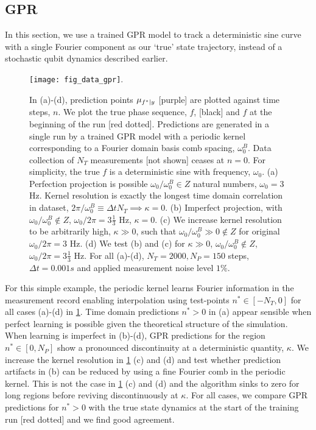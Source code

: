 \subsection{GPR} 
In this section, we use a trained GPR model to track a deterministic sine curve with a single Fourier component as our `true' state trajectory, instead of a stochastic qubit dynamics described earlier. %
\begin{figure}
    \texttt{[image: fig\_data\_gpr]}. 
    \caption{\label{fig:main:fig_data_gpr} In (a)-(d), prediction points $\mu_{f^*|y}$ [purple] are plotted against time steps, $n$. We plot the true phase sequence,  $f$, [black] and  $f$ at the beginning of the run [red dotted]. Predictions are generated in a single run by a trained GPR model with a periodic kernel corresponding to a Fourier domain basis comb spacing, $\omega_0^B$. Data collection of $N_T$ measurements [not shown] ceases at $n=0$. For simplicity, the true $f$ is a deterministic sine with frequency, $\omega_0$. (a) Perfection projection is possible $\omega_0 / \omega_0^B \in Z$ natural numbers, $\omega_0 = 3$ Hz. Kernel resolution is exactly the longest time domain correlation in dataset, $2 \pi / \omega_0^B \equiv \Delta t N_T \implies \kappa = 0$.   (b) Imperfect projection, with $\omega_0 / \omega_0^B \notin Z$, $\omega_0 / 2 \pi = 3 \frac{1}{3}$ Hz, $\kappa=0$. (c) We increase kernel resolution to be arbitrarily high, $\kappa \gg 0 $, such that $\omega_0 / \omega_0^B \gg 0 \notin Z $ for original $ \omega_0 / 2 \pi = 3$ Hz. (d) We test (b) and (c) for $\kappa \gg0$, $ \omega_0 / \omega_0^B \notin Z$, $\omega_0 / 2 \pi = 3 \frac{1}{3}$ Hz. For all (a)-(d), $N_T = 2000, N_P = 150$ steps, $\Delta t = 0.001s$ and applied measurement noise level $1\%$.} 
\end{figure}
For this simple example, the periodic kernel learns Fourier information in the measurement record enabling interpolation using test-points $n^* \in [-N_T, 0]$ for all cases (a)-(d) in \cref{fig:main:fig_data_gpr}. Time domain predictions $n^* >0$  in (a) appear sensible when perfect learning is possible given the theoretical structure of the simulation. When learning is imperfect in (b)-(d), GPR predictions for the region  $n^* \in [0, N_P]$ show a pronounced discontinuity at a deterministic quantity, $\kappa$.  We increase the kernel resolution in \cref{fig:main:fig_data_gpr} (c) and (d) and test whether prediction artifacts in (b) can be reduced by using a fine Fourier comb in the periodic kernel. This is not the case in \cref{fig:main:fig_data_gpr} (c) and (d) and the algorithm sinks to zero for long regions before reviving discontinuously at $\kappa$. For all cases, we compare GPR predictions for $n^*>0$ with the true state dynamics at the start of the training run [red dotted] and we find good agreement. 

